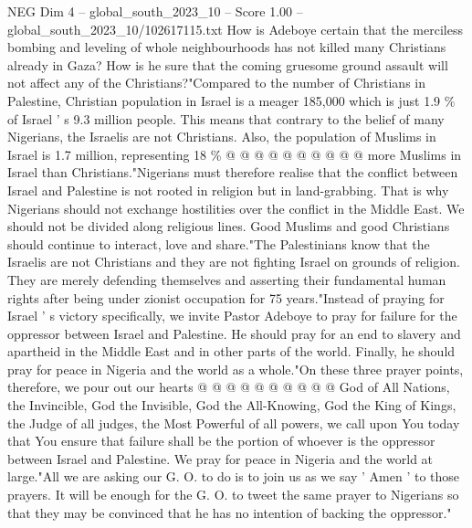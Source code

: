 \begin{textsample}{NEG Dim 4 – global\_south\_2023\_10 – Score 1.00 – global\_south\_2023\_10/102617115.txt}
How is Adeboye certain that the merciless bombing and leveling of whole neighbourhoods has not killed many Christians already in Gaza?
How is he sure that the coming gruesome ground assault will not affect any of the Christians?"Compared to the number of Christians in Palestine, Christian population in Israel is a meager 185,000 which is just 1.9 \% of Israel ' s 9.3 million people.
This means that contrary to the belief of many Nigerians, the Israelis are not Christians.
Also, the population of Muslims in Israel is 1.7 million, representing 18 \% @ @ @ @ @ @ @ @ @ @ more Muslims in Israel than Christians."Nigerians must therefore realise that the conflict between Israel and Palestine is not rooted in religion but in land-grabbing.
That is why Nigerians should not exchange hostilities over the conflict in the Middle East.
We should not be divided along religious lines.
Good Muslims and good Christians should continue to interact, love and share."The Palestinians know that the Israelis are not Christians and they are not fighting Israel on grounds of religion.
They are merely defending themselves and asserting their fundamental human rights after being under zionist occupation for 75 years."Instead of praying for Israel ' s victory specifically, we invite Pastor Adeboye to pray for failure for the oppressor between Israel and Palestine.
He should pray for an end to slavery and apartheid in the Middle East and in other parts of the world.
Finally, he should pray for peace in Nigeria and the world as a whole."On these three prayer points, therefore, we pour out our hearts @ @ @ @ @ @ @ @ @ @ God of All Nations, the Invincible, God the Invisible, God the All-Knowing, God the King of Kings, the Judge of all judges, the Most Powerful of all powers, we call upon You today that You ensure that failure shall be the portion of whoever is the oppressor between Israel and Palestine.
We pray for peace in Nigeria and the world at large."All we are asking our G.
O. to do is to join us as we say ' Amen ' to those prayers.
It will be enough for the G.
O. to tweet the same prayer to Nigerians so that they may be convinced that he has no intention of backing the oppressor."

\end{textsample}
